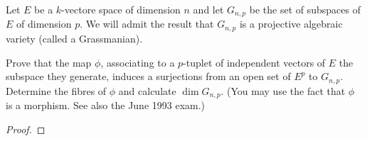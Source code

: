 \documentclass{article}
\begin{document}
 Let $E$ be a $k$-vectore space of dimension $n$ and let $G_{n,p}$ be the set of subspaces of $E$ of
dimension $p$. We will admit the result that $G_{n,p}$ is a projective algebraic variety (called a Grassmanian).

Prove that the map $\phi$, associating to a $p$-tuplet of independent vectors of $E$ the subspace they generate, 
induces a surjections from an open set of $E^p$ to $G_{n,p}$. Determine the fibres of $\phi$ and calculate
$\dim G_{n,p}$. (You may use the fact that $\phi$ is a morphism. See also the June 1993 exam.)

\begin{proof}


\end{proof}
\end{document}
